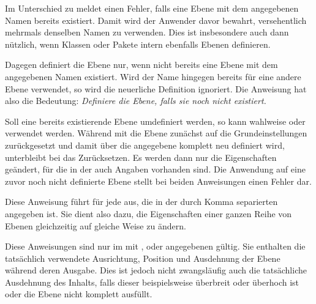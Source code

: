 \iffree{}{\clearpage}%
Im Unterschied zu  meldet
 einen Fehler, falls
eine Ebene mit dem angegebenen Namen bereits existiert. Damit wird der
Anwender davor bewahrt, versehentlich mehrmals denselben Namen zu
verwenden. Dies ist insbesondere auch dann nützlich, wenn Klassen oder Pakete
intern ebenfalls Ebenen definieren.

Dagegen definiert  die
Ebene nur, wenn nicht bereits eine Ebene mit dem angegebenen Namen
existiert. Wird der Name hingegen bereits für eine andere Ebene verwendet, so
wird die neuerliche Definition ignoriert. Die Anweisung hat also die
Bedeutung: \emph{Definiere die Ebene, falls sie noch nicht existiert.}

Soll eine bereits existierende Ebene umdefiniert werden, so kann wahlweise
 oder  verwendet werden. Während mit
 die Ebene zunächst
auf die Grundeinstellungen zurückgesetzt und damit über die angegebene
 komplett neu definiert wird, unterbleibt bei
 das Zurücksetzen. Es werden
dann nur die Eigenschaften geändert, für die in der  auch
Angaben vorhanden sind. Die Anwendung auf eine zuvor noch nicht definierte
Ebene stellt bei beiden Anweisungen einen Fehler dar.%
\EndIndexGroup

\begin{Declaration}
\end{Declaration}
Diese Anweisung führt
für jede  aus, die in der durch Komma separierten
 angegeben ist. Sie dient also dazu, die Eigenschaften
einer ganzen Reihe von Ebenen gleichzeitig auf gleiche Weise zu ändern.%
\EndIndexGroup

\begin{Declaration}
\end{Declaration}
Diese Anweisungen sind nur im mit ,  oder
 angegebenen  gültig. Sie enthalten die
tatsächlich verwendete Ausrichtung, Position und Ausdehnung der Ebene während
deren Ausgabe. Dies ist jedoch nicht zwangsläufig auch die tatsächliche
Ausdehnung des Inhalts, falls dieser beispielsweise überbreit oder überhoch
ist oder die Ebene nicht komplett ausfüllt.

